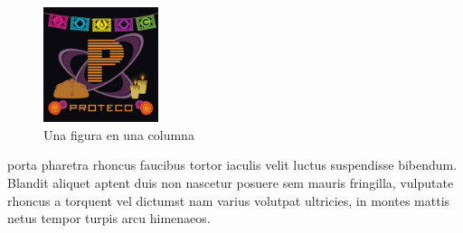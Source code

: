 \documentclass{article}
\begin{document}
\begin{multicols}{3}
		\begin{figure}[H] %
			\includegraphics[width=0.3\textwidth]{img/proteco}
			\caption{Una figura en una columna}
			\label{fig:col}
		\end{figure}
			porta pharetra rhoncus faucibus tortor iaculis velit luctus suspendisse bibendum. Blandit aliquet aptent duis non nascetur posuere sem mauris fringilla, vulputate rhoncus a torquent vel dictumst nam varius volutpat ultricies, in montes mattis netus tempor turpis arcu himenaeos.
			

\end{multicols}
\end{document}
